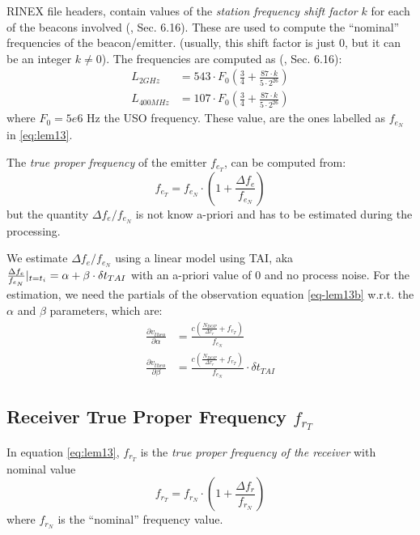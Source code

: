 RINEX file headers, contain values of the \emph{station frequency shift 
factor} $k$ for each of the beacons involved (\cite{DORISRNX3}, Sec. 6.16). 
These are used to compute the ``nominal'' frequencies of the beacon/emitter. 
(usually, this shift factor is just $0$, but it can be an integer 
$k \neq 0$). The frequencies are computed as (\cite{DORISRNX3}, Sec. 6.16):
\begin{equation}
  \begin{aligned}
    L_{2GHz}   &= 543 \cdot F_0 \left( \frac{3}{4} + \frac{87\cdot k}{5 \cdot 2^{26}} \right) \\
    L_{400MHz} &= 107 \cdot F_0 \left( \frac{3}{4} + \frac{87\cdot k}{5 \cdot 2^{26}} \right) 
  \end{aligned}
\end{equation}
where $F_0 = 5e6 \text{ Hz}$ the USO frequency. These value, are the ones 
labelled as $f_{e_N}$ in \ref{eq:lem13}.

The \emph{true proper frequency} of the emitter $f_{e_T}$, can be computed 
from:
\begin{equation}
  f_{e_T} = f_{e_N} \cdot \left( 1 + \frac{\Delta f_e}{f_{e_N}} \right)
\end{equation}
but the quantity $\Delta f_e / f_{e_N}$ is not know a-priori and has to be 
estimated during the processing.

We estimate $\Delta f_e / f_{e_N}$ using a \colorbox{blue!20}{linear model using TAI}, 
aka $\frac{\Delta f_e}{f_{e_N}}|_{t=t_i} = \alpha + \beta \cdot \delta t_{TAI}$
with an a-priori value of 0 and no process noise. For the estimation, we need 
the partials of the observation equation \ref{eq-lem13b} w.r.t. the $\alpha$ and 
$\beta$ parameters, which are:
\begin{equation}
  \begin{aligned}
  \frac{\partial v_{theo}}{\partial \alpha} &= 
    \frac{c(\frac{N_{DOP}}{\Delta\tau_r} + f_{r_T})}{f_{e_N}} \\
  \frac{\partial v_{theo}}{\partial \beta} &= 
    \frac{c(\frac{N_{DOP}}{\Delta\tau_r} + f_{r_T})}{f_{e_N}} \cdot \delta t_{TAI}
  \end{aligned}
\end{equation}

\subsection{Receiver True Proper Frequency $f_{r_T}$}
\label{ssec:receiver-true-proper-frequency}
In equation \ref{eq:lem13}, $f_{r_T}$ is the \emph{true proper frequency of 
the receiver} with nominal value 
\begin{equation}
  f_{r_T} = f_{r_N} \cdot \left( 1 + \frac{\Delta f_r}{f_{r_N}} \right)
\end{equation}
where $f_{r_N}$ is the ``nominal'' frequency value.

